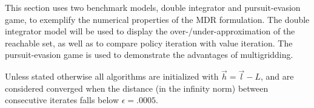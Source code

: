 This section uses two benchmark models, double integrator and pursuit-evasion game, to exemplify the numerical properties of the MDR formulation. The double integrator model will be used to display the over-/under-approximation of the reachable set, as well as to compare policy iteration with value iteration. The pursuit-evasion game is used to demonstrate the advantages of multigridding. 

Unless stated otherwise all algorithms are initialized with $\vec{h}=\vec{l}-L$, and are considered converged when the distance (in the infinity norm) between consecutive iterates falls below $\epsilon =.0005$.





